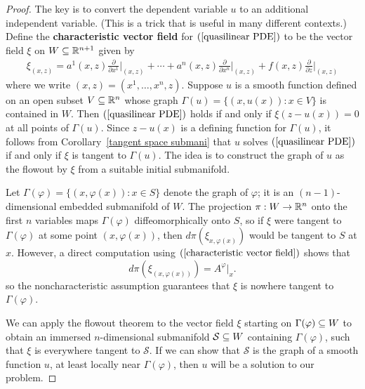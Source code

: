 \begin{proof}
The key is to convert the dependent variable $u$ to an additional independent variable. (This is a trick that is useful in many different contexts.) Define the \textbf{characteristic vector field} for $(\ref{quasilinear PDE})$ to be the vector field $\xi$ on $W\subseteq\mathbb{R}^{n+1}$ given by
\begin{align}\label{characteristic vector field}
\xi_{(x,z)}=a^1(x,z)\frac{\partial}{\partial x^1}\Big|_{(x,z)}+\cdots+a^n(x,z)\frac{\partial}{\partial x^n}\Big|_{(x,z)}+f(x,z)\frac{\partial}{\partial z}\Big|_{(x,z)}
\end{align}
where we write $(x,z)=(x^1,\dots,x^n,z)$. Suppose $u$ is a smooth function defined on an open subset $V\subseteq\mathbb{R}^n$ whose graph $\Gamma(u)=\{(x,u(x)):x\in V\}$ is contained in $W$. Then $(\ref{quasilinear PDE})$ holds if and only if $\xi(z-u(x))=0$ at all points of $\Gamma(u)$. Since $z-u(x)$ is a defining function for $\Gamma(u)$, it follows from Corollary~\ref{tangent space submani} that $u$ solves $(\ref{quasilinear PDE})$ if and only if $\xi$ is tangent to $\Gamma(u)$. The idea is to construct the graph of $u$ as the flowout by $\xi$ from a suitable initial submanifold.\par
Let $\Gamma(\varphi)=\{(x,\varphi(x)):x\in S\}$ denote the graph of $\varphi$; it is an $(n-1)$-dimensional embedded submanifold of $W$. The projection $\pi:W\to\mathbb{R}^n$ onto the first $n$ variables maps $\Gamma(\varphi)$ diffeomorphically onto $S$, so if $\xi$ were tangent to $\Gamma(\varphi)$ at some point $(x,\varphi(x))$, then $d\pi(\xi_{x,\varphi(x)})$ would be tangent to $S$ at $x$. However, a direct computation using $(\ref{characteristic vector field})$ shows that
\[d\pi(\xi_{(x,\varphi(x))})=A^\varphi|_x.\]
so the noncharacteristic assumption guarantees that $\xi$ is nowhere tangent to $\Gamma(\varphi)$.\par
We can apply the flowout theorem to the vector field $\xi$ starting on $\Gamma(\varphi)\subseteq W$ to obtain an immersed $n$-dimensional submanifold $\mathcal{S}\subseteq W$ containing $\Gamma(\varphi)$, such that $\xi$ is everywhere tangent to $\mathcal{S}$. If we can show that $\mathcal{S}$ is the graph of a smooth function $u$, at least locally near $\Gamma(\varphi)$, then $u$ will be a solution to our problem.\par

\end{proof}
